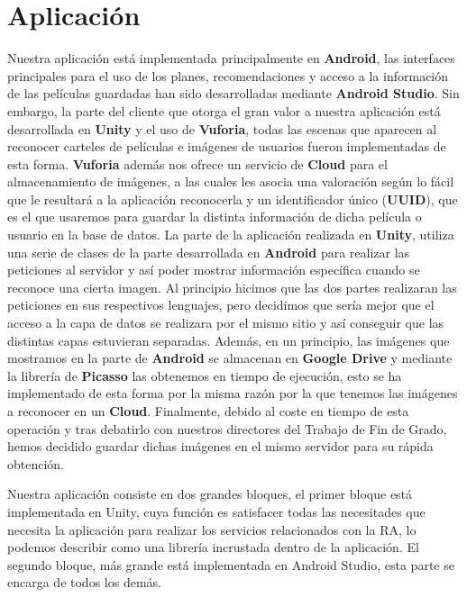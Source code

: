 \section{Aplicación}
\label{makereference4.3}
Nuestra aplicación está implementada principalmente en \textbf{Android}, las interfaces principales para el uso de los planes, recomendaciones y acceso a la información de las películas guardadas han sido desarrolladas mediante \textbf{Android Studio}. Sin embargo,
la parte del cliente que otorga el gran valor a nuestra aplicación está desarrollada en \textbf{Unity} y el uso de \textbf{Vuforia}, todas las escenas que aparecen al reconocer carteles de películas e imágenes de usuarios fueron implementadas de esta forma. \textbf{Vuforia} además nos ofrece un
servicio de \textbf{Cloud} para el almacenamiento de imágenes, a las cuales les asocia una valoración según lo fácil que le resultará a la aplicación reconocerla y un identificador único (\textbf{UUID}), que es el que usaremos para guardar la distinta información de dicha película o usuario en la base de datos.
La parte de la aplicación realizada en \textbf{Unity}, utiliza una serie de clases de la parte desarrollada en \textbf{Android} para realizar las peticiones al servidor y así poder mostrar información específica cuando se reconoce una cierta imagen.
Al principio hicimos que las dos partes realizaran las peticiones en sus respectivos lenguajes, pero decidimos que sería mejor que el acceso a la capa de datos se realizara por el mismo sitio y así conseguir que las distintas capas estuvieran separadas.
Además, en un principio, las imágenes que mostramos en la parte de \textbf{Android} se almacenan en \textbf{Google Drive} y mediante la librería de \textbf{Picasso} las obtenemos en tiempo de ejecución, esto se ha implementado de esta forma por la misma razón por la que tenemos las imágenes a reconocer en un \textbf{Cloud}.
Finalmente, debido al coste en tiempo de esta operación y tras debatirlo con nuestros directores del Trabajo de Fin de Grado, hemos decidido guardar dichas imágenes en el mismo servidor para su rápida obtención.

Nuestra aplicación consiste en dos grandes bloques, el primer bloque está implementada en Unity, cuya función es satisfacer todas las necesitades que necesita la aplicación para realizar los servicios relacionados con la RA, lo podemos describir como una librería incrustada dentro de la aplicación. El 
segundo bloque, más grande está implementada en Android Studio, esta parte se encarga de todos los demás. 


